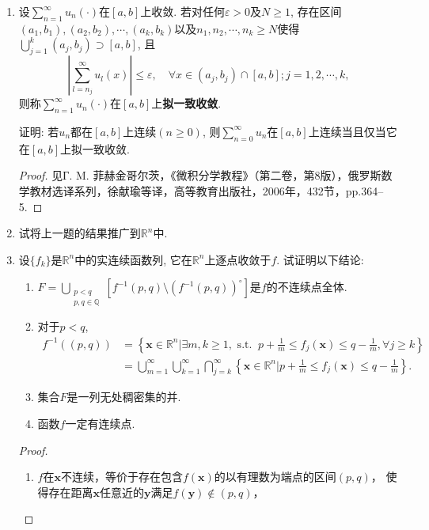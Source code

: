 \begin{quizb}
\begin{enumerate}
\item 设\(\sum_{n=1}^{\infty}u_n(\cdot)\)在\([a,b]\)上收敛. 
若对任何\(\varepsilon>0\)及\(N\geqslant 1\), 存在区间\((a_1,b_1),(a_2,b_2),\cdots,(a_k,b_k)\)以及\(n_1,n_2,\cdots,n_k\geqslant N\)使得\(\bigcup_{j=1}^{k}(a_j,b_j)\supset [a,b]\), 且
\[\left|\sum_{l=n_j}^{\infty}u_l(x)\right|\leqslant\varepsilon,\quad\forall x\in(a_j,b_j)\cap[a,b];j=1,2,\cdots,k,\]
则称\(\sum_{n=1}^{\infty}u_n(\cdot)\)在\([a,b]\)上\textbf{拟一致收敛}.

证明: 若\(u_n\)都在\([a,b]\)上连续\((n\geqslant 0)\), 则\(\sum_{n=0}^{\infty}u_n\)在\([a,b]\)上连续当且仅当它在\([a,b]\)上拟一致收敛.
\begin{proof}
见Г. M. 菲赫金哥尔茨，《微积分学教程》（第二卷，第8版），俄罗斯数学教材选译系列，徐献瑜等译，高等教育出版社，2006年，432节，pp.364--5.
\end{proof}
\item 试将上一题的结果推广到\(\mathbb{R}^n\)中.
\item 设\(\{f_k\}\)是\(\mathbb{R}^n\)中的实连续函数列, 它在\(\mathbb{R}^n\)上逐点收敛于\(f\). 试证明以下结论:\begin{enumerate}[label=(\roman*)]
\item \(F=\bigcup_{\substack{p<q\\p,q\in\mathbb{Q}}}\left[f^{-1}(p,q)\setminus(f^{-1}(p,q))^\circ\right]\)是\(f\)的不连续点全体.
\item 对于\(p<q\),\[\begin{split}
f^{-1}((p,q))&=\left\lbrace \boldsymbol{x}\in\mathbb{R}^n\big|\exists m,k\geqslant 1,\text{ s.t. }\ p+\frac{1}{m}\leqslant f_j(\boldsymbol{x})\leqslant q-\frac{1}{m},\forall j\geqslant k\right\rbrace\\
&=\bigcup_{m=1}^{\infty}\bigcup_{k=1}^{\infty}\bigcap_{j=k}^{\infty}\left\lbrace\boldsymbol{x}\in\mathbb{R}^n\big| p+\frac{1}{m}\leqslant f_j(\boldsymbol{x})\leqslant q-\frac{1}{m}\right\rbrace. 
\end{split}\]
\item 集合\(F\)是一列无处稠密集的并.
\item 函数\(f\)一定有连续点.
\end{enumerate}
\begin{proof}
\begin{enumerate}[label=(\roman*)]
\item $f$在$\boldsymbol{x}$不连续，等价于存在包含$f(\boldsymbol{x})$的以有理数为端点的区间$(p,q)$，
使得存在距离$\boldsymbol{x}$任意近的$\boldsymbol{y}$满足$f(\boldsymbol{y})\notin(p,q)$，

\end{enumerate}
\end{proof}
\end{enumerate}
\end{quizb}
